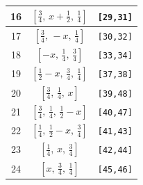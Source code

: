 \documentclass[fleqn,8pt]{jsarticle}
\begin{document}
\begin{longtable}{ccc}
16 & $\left[ \frac{3}{4},\, x + \frac{1}{2},\, \frac{1}{4} \right]$ & {\tt [29,31]} \\ \hline
17 & $\left[ \frac{3}{4},\, - x,\, \frac{1}{4} \right]$ & {\tt [30,32]} \\ \hline
18 & $\left[ - x,\, \frac{1}{4},\, \frac{3}{4} \right]$ & {\tt [33,34]} \\ \hline
19 & $\left[ \frac{1}{2} - x,\, \frac{3}{4},\, \frac{1}{4} \right]$ & {\tt [37,38]} \\ \hline
20 & $\left[ \frac{3}{4},\, \frac{1}{4},\, x \right]$ & {\tt [39,48]} \\ \hline
21 & $\left[ \frac{3}{4},\, \frac{1}{4},\, \frac{1}{2} - x \right]$ & {\tt [40,47]} \\ \hline
22 & $\left[ \frac{1}{4},\, \frac{1}{2} - x,\, \frac{3}{4} \right]$ & {\tt [41,43]} \\ \hline
23 & $\left[ \frac{1}{4},\, x,\, \frac{3}{4} \right]$ & {\tt [42,44]} \\ \hline
24 & $\left[ x,\, \frac{3}{4},\, \frac{1}{4} \right]$ & {\tt [45,46]} \\
\end{longtable}
\renewcommand{\arraystretch}{1.2}
\end{document}
